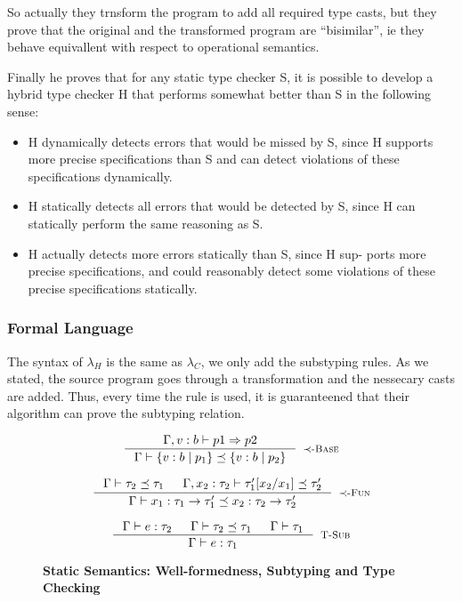 So actually they trnsform the program to add all required type casts, but they prove that
the original and the transformed program are ``bisimilar'', ie they behave equivallent with respect to 
operational semantics.

Finally he proves that for any static type checker S, it is possible to 
develop a hybrid type checker H
that performs somewhat better than S in the following sense:
\begin{itemize}
\item H dynamically detects errors that would be missed by S, since
H supports more precise specifications than S and can detect
violations of these specifications dynamically.
\item H statically detects all errors that would be detected by S, since
H can statically perform the same reasoning as S.
\item H actually detects more errors statically than S, since H sup-
ports more precise specifications, and could reasonably detect
some violations of these precise specifications statically.
\end{itemize}

\subsubsection{Formal Language}

The syntax of $\lambda_H$ is the same as $\lambda_C$, we only add the substyping rules.
As we stated, the source program goes through a transformation and the nessecary casts are added.
Thus, every time the \tsub rule is used, it is guaranteened that their algorithm can prove
the subtyping relation.

\begin{figure}[ht!]
\medskip {}

$$
\inference
   {\Gamma, v:b \vdash  p1 \Rightarrow p2 }
   {\isSubType{\Gamma}{\tref{b}{p_1}}{\tref{b}{p_2}}}
   [\tsubBase]
$$

$$
\inference
   {\isSubType{\Gamma}{\tau_2}{\tau_1} &
	\isSubType{\Gamma, x_2:{\tau_2}}{\SUBST{\tau_1'}{x_1}{x_2}}{\tau_2'}	
   }
   {\isSubType{\Gamma}
	  {\tfun{x_1}{\tau_1}{\tau_1'}}
	  {\tfun{x_2}{\tau_2}{\tau_2'}}
}[\tsubFun]
$$


\medskip {}

$$\begin{array}{cc}

\inference
  {  \hastype{\Gamma}{e}{\tau_2} && \isSubType{\Gamma}{\tau_2}{\tau_1} 
  && \isWellFormed{\Gamma}{\tau_1}
  }
  {\hastype{\Gamma}{e}{\tau_1}}
  [\tsub]
\end{array}$$

\caption{\textbf{Static Semantics: Well-formedness, Subtyping and Type Checking}}
\label{fig:rules}
\end{figure}

 
